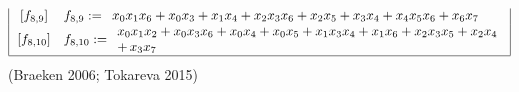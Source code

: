 \documentclass[pdf,sprung,slideColor,nocolorBG]{beamer}
\newenvironment{colortheme}[1]{
\def\ProvidesPackageRCS $##1${\relax}
\renewcommand{\ProcessOptions}{\relax}
\makeatletter

\makeatother
}{}
\newcommand{\slidecite}[1]{\tiny{(#1)}\normalsize{}}
\begin{document}
\begin{colortheme}{seagull}
\begin{frame}
\begin{align*}
\begin{array}{|cl|}
\,[f_{ 8 , 9 }] & f_{ 8 , 9 } :=
\begin{array}{l}
x_{0} x_{1} x_{6} + x_{0} x_{3} + x_{1} x_{4} + x_{2} x_{3} x_{6} + x_{2} x_{5} + x_{3} x_{4} + x_{4} x_{5} x_{6} + x_{6} x_{7}
\end{array}
\\
\,[f_{ 8 , 10 }] & f_{ 8 , 10 } :=
\begin{array}{l}
x_{0} x_{1} x_{2} + x_{0} x_{3} x_{6} + x_{0} x_{4} + x_{0} x_{5} + x_{1} x_{3} x_{4} + x_{1} x_{6} + x_{2} x_{3} x_{5} + x_{2} x_{4}
\\
+\,  x_{3} x_{7}
\end{array}
\\
\hline
\end{array}
\end{align*}
\slidecite{Braeken 2006; Tokareva 2015}
\normalsize{}
\end{frame}

\end{colortheme}
\end{document}

